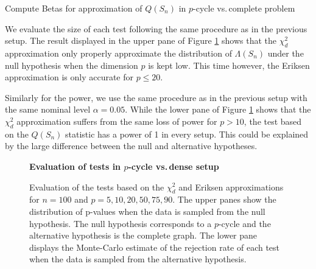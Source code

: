 \begin{algorithm}[t!]
    \caption{Compute Betas for approximation of $Q(S_n)$ in $p$-cycle vs.\,complete problem}
    \label{alg:comp-beta}
    \begin{algorithmic}[1]

                \EndIf
                


            \EndFor
        \EndFor
    \end{algorithmic}
\end{algorithm}

We evaluate the size of each test following the same procedure as in the previous setup. The result displayed in the upper pane of Figure \ref{fig-complete-to-pcycle} shows that the $\chi^2_d$ approximation only properly approximate the distribution of $\Lambda(S_n)$ under the null hypothesis when the dimension $p$ is kept low. This time however, the Eriksen approximation is only accurate for $p \leq 20$.

Similarly for the power, we use the same procedure as in the previous setup with the same nominal level $\alpha = 0.05$. While the lower pane of Figure \ref{fig-complete-to-pcycle} shows that the $\chi^2_d$ approximation suffers from the same loss of power for $p > 10$, the test based on the $Q(S_n)$ statistic has a power of 1 in every setup. This could be explained by the large difference between the null and alternative hypotheses.

\begin{figure}[!tbp]
    \textbf{Evaluation of tests in $p$-cycle vs.\,dense setup}
    \centering
    \qquad
    \caption{Evaluation of the tests based on the $\chi^2_d$ and Eriksen approximations for $n = 100$ and $p = 5, 10, 20, 50, 75, 90$. The upper panes show the distribution of p-values when the data is sampled from the null hypothesis. The null hypothesis corresponds to a $p$-cycle and the alternative hypothesis is the complete graph. The lower pane displays the Monte-Carlo estimate of the rejection rate of each test when the data is sampled from the alternative hypothesis.}
    \label{fig-complete-to-pcycle}
\end{figure}
